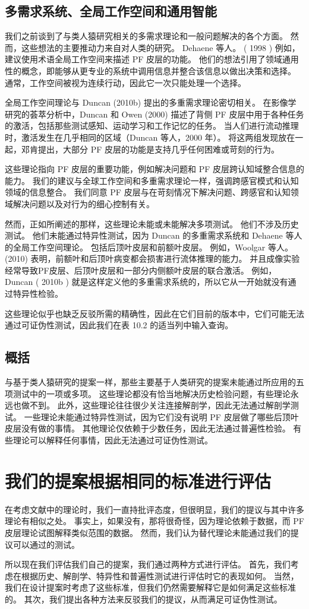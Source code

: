 \subsection{多需求系统、全局工作空间和通用智能}
我们之前谈到了与类人猿研究相关的多需求理论和一般问题解决的各个方面。 然而，这些想法的主要推动力来自对人类的研究。 Dehaene 等人。 ( 1998 ) 例如，建议使用术语全局工作空间来描述 PF 皮层的功能。 他们的想法引用了领域通用性的概念，即能够从更专业的系统中调用信息并整合该信息以做出决策和选择。 通常，工作空间被视为连续行动，因此它一次只能处理一个选择。
\par 
全局工作空间理论与 Duncan (2010b) 提出的多重需求理论密切相关。 在影像学研究的荟萃分析中，Duncan 和 Owen (2000) 描述了背侧 PF 皮层中用于各种任务的激活，包括那些测试感知、运动学习和工作记忆的任务。 当人们进行流动推理时，激活发生在几乎相同的区域（Duncan 等人，2000 年）。 将这两组发现放在一起，邓肯提出，大部分 PF 皮层的功能是支持几乎任何困难或苛刻的行为。
\par 
这些理论指向 PF 皮层的重要功能，例如解决问题和 PF 皮层跨认知域整合信息的能力。 我们的建议与全球工作空间和多重需求理论一样，强调跨感官模式和认知领域的信息整合。 我们同意 PF 皮层与在苛刻情况下解决问题、跨感官和认知领域解决问题以及对行为的细心控制有关。
\par 
然而，正如所阐述的那样，这些理论未能或未能解决多项测试。 他们不涉及历史测试。 他们未能通过特异性测试，因为 Duncan 的多重需求系统和 Dehaene 等人的全局工作空间理论。 包括后顶叶皮层和前额叶皮层。 例如，Woolgar 等人。 (2010) 表明，前额叶和后顶叶病变都会损害进行流体推理的能力。 并且成像实验经常导致PF皮层、后顶叶皮层和一部分内侧额叶皮层的联合激活。 例如，Duncan ( 2010b ) 就是这样定义他的多重需求系统的，所以它从一开始就没有通过特异性检验。
\par 
这些理论似乎也缺乏反驳所需的精确性，因此在它们目前的版本中，它们可能无法通过可证伪性测试，因此我们在表 10.2 的适当列中输入查询。
\subsection{概括}
与基于类人猿研究的提案一样，那些主要基于人类研究的提案未能通过所应用的五项测试中的一项或多项。 这些理论都没有恰当地解决历史检验问题，有些理论永远也做不到。 此外，这些理论往往很少关注连接解剖学，因此无法通过解剖学测试。 一些理论未能通过特异性测试，因为它们没有说明 PF 皮层做了哪些后顶叶皮层没有做的事情。 其他理论仅依赖于少数任务，因此无法通过普遍性检验。 有些理论可以解释任何事情，因此无法通过可证伪性测试。
\section{我们的提案根据相同的标准进行评估}
在考虑文献中的理论时，我们一直持批评态度，但很明显，我们的提议与其中许多理论有相似之处。 事实上，如果没有，那将很奇怪，因为理论依赖于数据，而 PF 皮层理论试图解释类似范围的数据。 然而，我们认为替代理论未能通过我们的提议可以通过的测试。
\par 
所以现在我们评估我们自己的提案，我们通过两种方式进行评估。 首先，我们考虑在根据历史、解剖学、特异性和普遍性测试进行评估时它的表现如何。 当然，我们在设计提案时考虑了这些标准，但我们仍然需要解释它是如何满足这些标准的。 其次，我们提出各种方法来反驳我们的提议，从而满足可证伪性测试。
